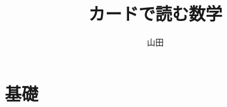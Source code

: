 \documentclass[uplatex,dvipdfmx,openany]{jsbook}
\title{カードで読む数学}
\author{山田}
\date{}
\begin{document}
\maketitle
\tableofcontents
\part{基礎}


\end{document}
